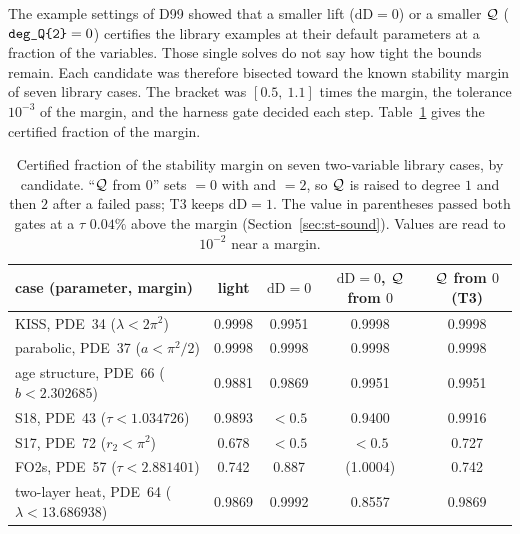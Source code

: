 The example settings of D99 showed that a smaller lift ($\mathrm{dD}=0$) or a smaller $\mathcal{Q}$ ($\texttt{deg\_Q\{2\}}=0$) certifies the library examples at their default parameters at a fraction of the variables. Those single solves do not say how tight the bounds remain. Each candidate was therefore bisected toward the known stability margin of seven library cases. The bracket was $[0.5,\ 1.1]$ times the margin, the tolerance $10^{-3}$ of the margin, and the harness gate decided each step. Table~\ref{tab:st-tight} gives the certified fraction of the margin.

\begin{table}[h]\centering\footnotesize
\setlength{\tabcolsep}{4pt}
\begin{tabular}{lcccc}
\toprule
case (parameter, margin) & light & $\mathrm{dD}=0$ & $\mathrm{dD}=0$, $\mathcal{Q}$ from $0$ & $\mathcal{Q}$ from $0$ (T3) \\
\midrule
KISS, PDE~34 ($\lambda<2\pi^2$) & 0.9998 & 0.9951 & 0.9998 & 0.9998 \\
parabolic, PDE~37 ($a<\pi^2/2$) & 0.9998 & 0.9998 & 0.9998 & 0.9998 \\
age structure, PDE~66 ($b<2.302685$) & 0.9881 & 0.9869 & 0.9951 & 0.9951 \\
S18, PDE~43 ($\tau<1.034726$) & 0.9893 & $<0.5$ & 0.9400 & 0.9916 \\
S17, PDE~72 ($r_2<\pi^2$) & 0.678 & $<0.5$ & $<0.5$ & 0.727 \\
FO2s, PDE~57 ($\tau<2.881401$) & 0.742 & 0.887 & (1.0004) & 0.742 \\
two-layer heat, PDE~64 ($\lambda<13.686938$) & 0.9869 & 0.9992 & 0.8557 & 0.9869 \\
\bottomrule
\end{tabular}
\caption{Certified fraction of the stability margin on seven two-variable library cases, by candidate. ``$\mathcal{Q}$ from $0$'' sets  $=0$ with   and  $=2$, so $\mathcal{Q}$ is raised to degree $1$ and then $2$ after a failed pass; T3 keeps $\mathrm{dD}=1$. The value in parentheses passed both gates at a $\tau$ $0.04\%$ above the margin (Section~\ref{sec:st-sound}). Values are read to $10^{-2}$ near a margin.}\label{tab:st-tight}
\end{table}

